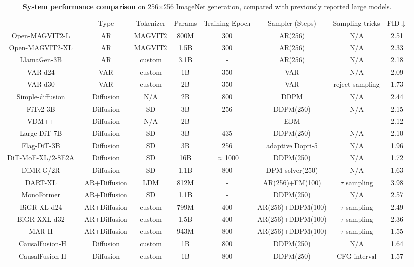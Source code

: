 \begin{table}[t]
\footnotesize
\begin{tabular}{c|ccccccc}
& Type & Tokenizer & Params & Training Epoch & Sampler (Steps) & Sampling tricks & FID$\downarrow$  \\
\shline
Open-MAGVIT2-L~\cite{luo2024open} & AR & MAGVIT2 & 800M & 300 & AR(256) & N/A  & 2.51 \\
Open-MAGVIT2-XL~\cite{luo2024open} & AR & MAGVIT2 & 1.5B & 300 & AR(256) & N/A  & 2.33 \\
LlamaGen-3B~\cite{sun2024autoregressive} & AR & custom & 3.1B & - & AR(256) & N/A & 2.18 \\
VAR-d24~\cite{tian2024visual} & VAR & custom & 1B & 350 & VAR & N/A  & 2.09\\
VAR-d30~\cite{tian2024visual} & VAR & custom & 2B & 350 & VAR & reject sampling & 1.73 \\
\hline
Simple-diffusion~\cite{hoogeboom2023simple} & Diffusion & N/A & 2B & 800 & DDPM & N/A  & 2.44 \\ 
FiTv2-3B~\cite{wang2024fitv2} & Diffusion & SD & 3B & 256 & DDPM(250) & N/A & 2.15 \\
VDM++~\cite{kingma2024understanding} & Diffusion & N/A & 2B & - & EDM & - & 2.12 \\
Large-DiT-7B~\cite{gao2024lumina} & Diffusion & SD & 3B & 435 & DDPM(250) & N/A & 2.10 \\
Flag-DiT-3B~\cite{gao2024lumina} & Diffusion & SD & 3B & 256 & adaptive Dopri-5 & N/A & 1.96 \\
DiT-MoE-XL/2-8E2A~\cite{fei2024scaling} & Diffusion & SD & 16B & $\approx$1000 & DDPM(250) & N/A & 1.72 \\
DiMR-G/2R~\cite{liu2024alleviating} & Diffusion & SD & 1.1B & 800 & DPM-solver(250) & N/A & 1.63 \\
\hline
DART-XL~\cite{dart} & AR+Diffusion & LDM & 812M & - & AR(256)+FM(100) & $\tau$ sampling & 3.98 \\
MonoFormer~\cite{monoformer} & AR+Diffusion & SD & 1.1B & - & DDPM(250) & N/A & 2.57 \\
BiGR-XL-d24~\cite{bigr} & AR+Diffusion & custom & 799M & 400 & AR(256)+DDPM(100) & $\tau$ sampling  & 2.49 \\
BiGR-XXL-d32~\cite{bigr} & AR+Diffusion & custom & 1.5B & 400 & AR(256)+DDPM(100) & $\tau$ sampling  & 2.36 \\
MAR-H~\cite{mar} & AR+Diffusion & custom & 943M & 800 & AR(256)+DDPM(100) & $\tau$ sampling & 1.55 \\
\hline
CausalFusion-H & Diffusion & custom & 1B & 800 & DDPM(250) & N/A & 1.64 \\
CausalFusion-H & Diffusion & custom & 1B & 800 & DDPM(250) & CFG interval & {1.57} \\
\end{tabular}
\vspace{-5pt}
\caption{
\textbf{System performance comparison} on 256$\times$256 ImageNet generation, compared with previously reported large models.
\vspace{-10pt}
}
\label{tab:system2}
\end{table}


